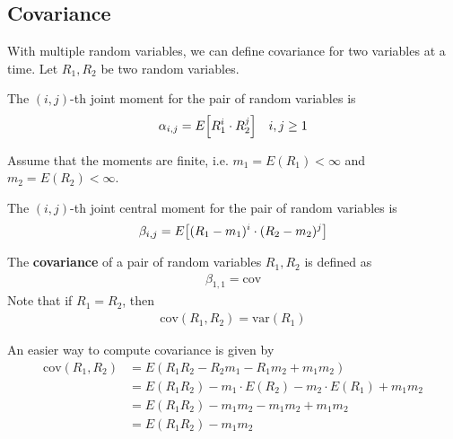 \subsection{Covariance}
With multiple random variables, we can define covariance for two variables at a time. Let $R_1,R_2$ be two random variables.
\begin{definition}
     The $(i,j)$-th joint moment for the pair of random variables is
    \begin{align}
        \alpha_{i,j} = E\qty[R_1^i \cdot R_2^j] && i,j \ge 1
    \end{align}
\end{definition}
Assume that the moments are finite, i.e. $m_1 = E(R_1) < \infty$ and $m_2 = E(R_2) < \infty$.
\begin{definition}
    The $(i,j)$-th joint central moment for the pair of random variables is
    \begin{align}
        \beta_{i,j} = E\qty[(R_1 - m_1)^i \cdot (R_2 - m_2)^j]
    \end{align}
\end{definition}
\begin{definition}
    The \textbf{covariance} of a pair of random variables $R_1,R_2$ is defined as
    \begin{align}
        \beta_{1,1} = \text{cov}
    \end{align}
    Note that if $R_1 = R_2$, then
    \begin{align}
        \text{cov}(R_1,R_2) = \text{var}(R_1)
    \end{align}
\end{definition}
\begin{proposition}
    An easier way to compute covariance is given by
    \begin{align}
        \text{cov}(R_1,R_2) &= E(R_1R_2 - R_2m_1 - R_1m_2 + m_1m_2)\\
        &= E(R_1R_2) - m_1 \cdot E(R_2) - m_2 \cdot E(R_1) + m_1m_2\\
        &= E(R_1R_2) - m_1 m_2 - m_1 m_2 + m_1m_2\\
        &= E(R_1R_2) - m_1 m_2
    \end{align}
\end{proposition}

